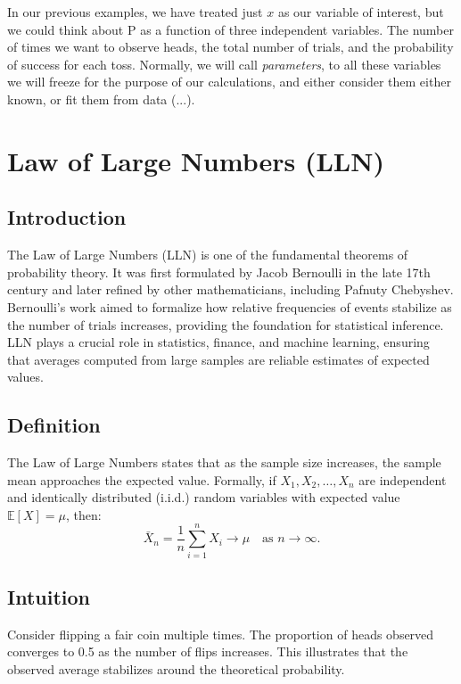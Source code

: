 \documentclass{book}
\begin{document}
In our previous examples, we have treated just $x$ as our variable of interest, but we could think about P as a function of three independent variables. The number of times we want to observe heads, the total number of trials, and the probability of success for each toss. Normally, we will call \textit{parameters}, to all these variables we will freeze for the purpose of our calculations, and either consider them either known, or fit them from data (...).
 
 \newpage 
 
\section{Law of Large Numbers (LLN)}

\subsection{Introduction}
The Law of Large Numbers (LLN) is one of the fundamental theorems of probability theory. It was first formulated by Jacob Bernoulli in the late 17th century and later refined by other mathematicians, including Pafnuty Chebyshev. Bernoulli's work aimed to formalize how relative frequencies of events stabilize as the number of trials increases, providing the foundation for statistical inference. LLN plays a crucial role in statistics, finance, and machine learning, ensuring that averages computed from large samples are reliable estimates of expected values.

\subsection{Definition}
The Law of Large Numbers states that as the sample size increases, the sample mean approaches the expected value. Formally, if $X_1, X_2, \dots, X_n$ are independent and identically distributed (i.i.d.) random variables with expected value $\mathbb{E}[X] = \mu$, then:
\begin{equation}
    \bar{X}_n = \frac{1}{n} \sum_{i=1}^{n} X_i \to \mu \quad \text{as } n \to \infty.
\end{equation}

\subsection{Intuition}
Consider flipping a fair coin multiple times. The proportion of heads observed converges to 0.5 as the number of flips increases. This illustrates that the observed average stabilizes around the theoretical probability.
\end{document}
